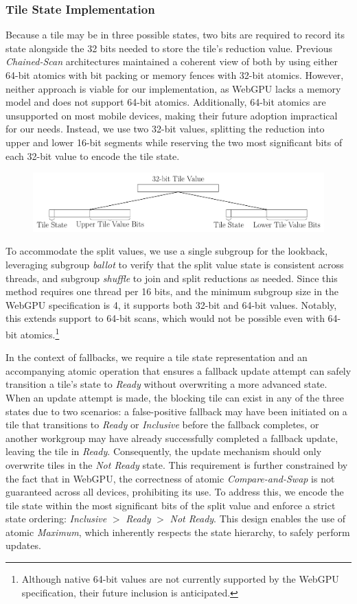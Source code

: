 \documentclass[sigconf]{acmart}
\begin{document}
\subsubsection{Tile State Implementation}
Because a tile may be in three possible states, two bits are required to record its state alongside the 32 bits needed to store the tile's reduction value. Previous \emph{Chained-Scan} architectures maintained a coherent view of both by using either 64-bit atomics with bit packing or memory fences with 32-bit atomics. However, neither approach is viable for our implementation, as WebGPU lacks a memory model and does not support 64-bit atomics. Additionally, 64-bit atomics are unsupported on most mobile devices, making their future adoption impractical for our needs. Instead, we use two 32-bit values, splitting the reduction into upper and lower 16-bit segments while reserving the two most significant bits of each 32-bit value to encode the tile state.
\begin{figure}[h!]
  \centering
  \includegraphics[width=\linewidth]{graphics/split.pdf}
\end{figure}
To accommodate the split values, we use a single subgroup for the lookback, leveraging subgroup \emph{ballot} to verify that the split value state is consistent across threads, and subgroup \emph{shuffle} to join and split reductions as needed. Since this method requires one thread per 16 bits, and the minimum subgroup size in the WebGPU specification is 4, it supports both 32-bit and 64-bit values. Notably, this extends support to 64-bit scans, which would not be possible even with 64-bit atomics.\footnote{Although native 64-bit values are not currently supported by the WebGPU specification, their future inclusion is anticipated.}

In the context of fallbacks, we require a tile state representation and an accompanying atomic operation that ensures a fallback update attempt can safely transition a tile's state to \emph{Ready} without overwriting a more advanced state. When an update attempt is made, the blocking tile can exist in any of the three states due to two scenarios: a false-positive fallback may have been initiated on a tile that transitions to \emph{Ready} or \emph{Inclusive} before the fallback completes, or another workgroup may have already successfully completed a fallback update, leaving the tile in \emph{Ready}. Consequently, the update mechanism should only overwrite tiles in the \emph{Not Ready} state. This requirement is further constrained by the fact that in WebGPU, the correctness of atomic \emph{Compare-and-Swap} is not guaranteed across all devices, prohibiting its use. To address this, we encode the tile state within the most significant bits of the split value and enforce a strict state ordering: \emph{Inclusive} $>$ \emph{Ready} $>$ \emph{Not Ready}. This design enables the use of atomic \emph{Maximum}, which inherently respects the state hierarchy, to safely perform updates.
\end{document}

